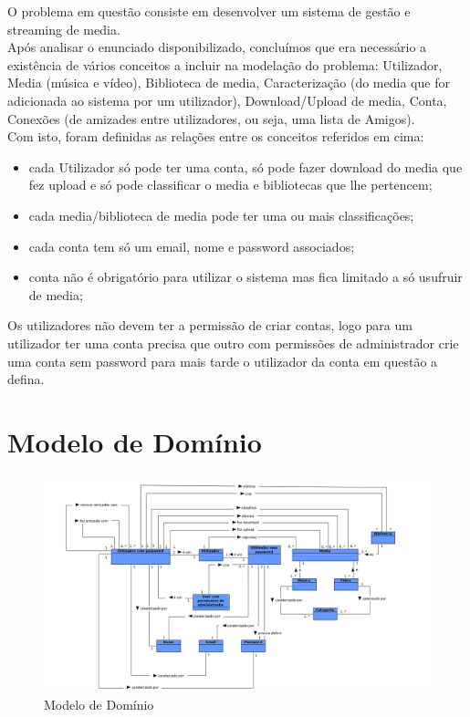 \documentclass[a4paper]{report}
\begin{document}
O problema em questão consiste em desenvolver um sistema de gestão e streaming
de media.\\
Após analisar o enunciado disponibilizado, concluímos que era necessário a
existência de vários conceitos a incluir na modelação do problema: Utilizador,
Media (música e vídeo), Biblioteca de media, Caracterização (do media que for
adicionada ao sistema por um utilizador), Download/Upload de media, Conta,
Conexões (de amizades entre utilizadores, ou seja, uma lista de Amigos).\\
Com isto, foram definidas as relações entre os conceitos referidos em cima:
\begin{itemize}
    \item cada Utilizador só pode ter uma conta, só pode fazer download do
        media que fez upload e só pode classificar o media e bibliotecas
        que lhe pertencem;
    \item cada media/biblioteca de media pode ter uma ou mais classificações;
    \item cada conta tem só um email, nome e password associados;
    \item conta não é obrigatório para utilizar o sistema mas fica limitado 
        a só usufruir de media;
\end{itemize}
Os utilizadores não devem ter a permissão de criar contas, logo para um
utilizador ter uma conta precisa que outro com permissões de administrador crie
uma conta sem password para mais tarde o utilizador da conta em questão a
defina.

\section{Modelo de Domínio}

\begin{figure}[H]
	\centering 
    \includegraphics[width=\textwidth]{images/Dominio.png}  
    \caption{Modelo de Domínio}
\end{figure}
\end{document}
